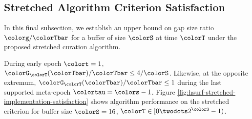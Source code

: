 \subsection{Stretched Algorithm Criterion Satisfaction}
\label{sec:stretched-satisfaction}

In this final subsection, we establish an upper bound on gap size ratio $\colorg / \colorTbar$ for a buffer of size $\colorS$ at time $\colorT$ under the proposed stretched curation algorithm.



During early epoch $\colort = 1$, $\colorG_{\colorT}(\colorTbar)/\colorTbar \leq 4/\colorS$.
Likewise, at the opposite extremum, $\colorG_{\colorT}(\colorTbar)/\colorTbar \leq 1$ during the last supported meta-epoch $\colortau = \colors - 1$.
Figure \ref{fig:hsurf-stretched-implementation-satisfaction} shows algorithm performance on the stretched criterion for buffer size $\colorS=16$, $\colorT \in [0\twodots 2^{\colorS} - 1)$.
